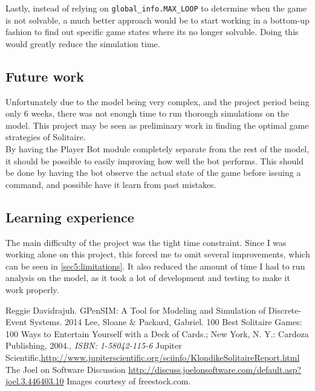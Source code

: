 \documentclass[runningheads,a4paper]{llncs}
\begin{document}
Lastly, instead of relying on \verb!global_info.MAX_LOOP! to determine when the game is not solvable, a much better approach would be to start working in a bottom-up fashion to find out specific game states where its no longer solvable. Doing this would greatly reduce the simulation time.

\subsection{Future work}
\label{sec5_future_work}
Unfortunately due to the model being very complex, and the project period being only 6 weeks, there was not enough time to run thorough simulations on the model. This project may be seen as preliminary work in finding the optimal game strategies of Solitaire. \\

By having the Player Bot module completely separate from the rest of the model, it should be possible to easily improving how well the bot performs. This should be done by having the bot observe the actual state of the game before issuing a command, and possible have it learn from past mistakes.

\subsection{Learning experience}
\label{sec5_learning_experience}
The main difficulty of the project was the tight time constraint. Since I was working alone on this project, this forced me to omit several improvements, which can be seen in \ref{sec5:limitations}. It also reduced the amount of time I had to run analysis on the model, as it took a lot of development and testing to make it work properly.
\clearpage
\begin{thebibliography}{6}

 Reggie Davidrajuh. GPenSIM: A Tool for Modeling and Simulation of Discrete-Event Systems. 2014
 Lee, Sloane \& Packard, Gabriel. 100 Best Solitaire Games: 100 Ways to Entertain Yourself with a Deck of Cards.; New York, N. Y.: Cardoza Publishing, 2004., \emph{ISBN: 1-58042-115-6}
 Jupiter Scientific,\url{http://www.jupiterscientific.org/sciinfo/KlondikeSolitaireReport.html}
 The Joel on Software Discussion \url{http://discuss.joelonsoftware.com/default.asp?joel.3.446403.10}
 Images courtesy of freestock.com.

\end{thebibliography}
\appendix
\end{document}

